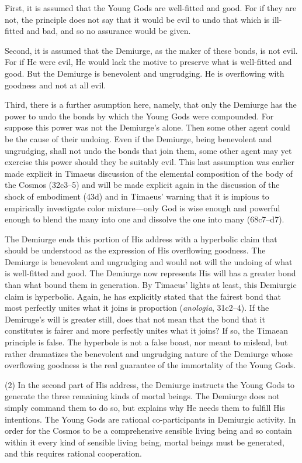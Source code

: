 First, it is assumed that the Young Gods are well-fitted and good. For if they are not, the principle does not say that it would be evil to undo that which is ill-fitted and bad, and so no assurance would be given. 

Second, it is assumed that the Demiurge, as the maker of these bonds, is not evil. For if He were evil, He would lack the motive to preserve what is well-fitted and good. But the Demiurge is benevolent and ungrudging. He is overflowing with goodness and not at all evil. 

Third, there is a further asumption here, namely, that only the Demiurge has the power to undo the bonds by which the Young Gods were compounded. For suppose this power was not the Demiurge's alone. Then some other agent could be the cause of their undoing. Even if the Demiurge, being benevolent and ungrudging, shall not undo the bonds that join them, some other agent may yet exercise this power should they be suitably evil. This last assumption was earlier made explicit in Timaeus discussion of the elemental composition of the body of the Cosmos (32c3--5) and will be made explicit again in the discussion of the shock of embodiment (43d) and in Timaeus' warning that it is impious to empirically investigate color mixture---only God is wise enough and powerful enough to blend the many into one and dissolve the one into many (68c7–d7).

The Demiurge ends this portion of His address with a hyperbolic claim that should be understood as the expression of His overflowing goodness. The Demiurge is benevolent and ungrudging and would not will the undoing of what is well-fitted and good. The Demiurge now represents His will has a greater bond than what bound them in generation. By Timaeus' lights at least, this Demiurgic claim is hyperbolic. Again, he has explicitly stated that the fairest bond that most perfectly unites what it joins is proportion (\emph{anologia}, 31c2--4). If the Demiruge's will is greater still, does that not mean that the bond that it constitutes is fairer and more perfectly unites what it joins? If so, the Timaean principle is false. The hyperbole is not a false boast, nor meant to mislead, but rather dramatizes the benevolent and ungrudging nature of the Demiurge whose overflowing goodness is the real guarantee of the immortality of the Young Gods. 

(2) In the second part of His address, the Demiurge instructs the Young Gods to generate the three remaining kinds of mortal beings. The Demiurge does not simply command them to do so, but explains why He needs them to fulfill His intentions. The Young Gods are rational co-participants in Demiurgic activity. In order for the Cosmos to be a comprehensive sensible living being and so contain within it every kind of sensible living being, mortal beings must be generated, and this requires rational cooperation.

